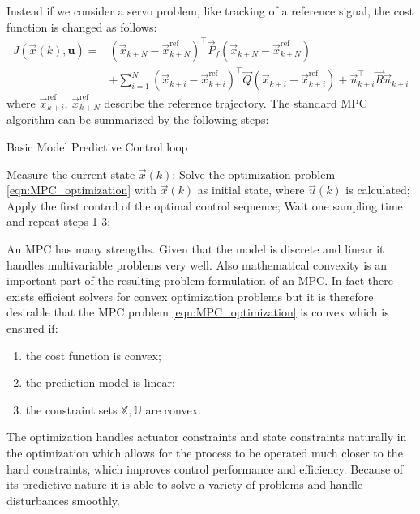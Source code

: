 Instead if we consider a servo problem, like tracking of a reference signal, the cost function is changed as follows:
\begin{equation}
\label{eqn:MPC_cost_function_servo}
\begin{aligned}
J(\vec{x}(k), \textbf{u})=& (\vec{x}_{k+N}-\vec{x}^\text{ref}_{k+N})^\intercal\vec{P}_f(\vec{x}_{k+N}-\vec{x}^\text{ref}_{k+N})\\
&+\sum_{i=1}^{N}(\vec{x}_{k+i}-\vec{x}^\text{ref}_{k+i})^\intercal\vec{Q}(\vec{x}_{k+i}-\vec{x}^\text{ref}_{k+i})+\vec{u}_{k+i}^\intercal\vec{R}\vec{u}_{k+i}
\end{aligned}
\end{equation}
where $\vec{x}^\text{ref}_{k+i}$, $\vec{x}^\text{ref}_{k+N}$ describe the reference trajectory. The standard MPC algorithm can be summarized by the following steps:
\begin{algorithm}%
	\caption{Basic Model Predictive Control loop}
	\small
	\begin{algorithmic}[1]
		\State Measure the current state $\vec{x}(k)$;
		\State Solve the optimization problem \ref{eqn:MPC_optimization} with $\vec{x}(k)$ as initial state, where $\vec{u}(k)$ is calculated;
		\State Apply the first control of the optimal control sequence;
		\State Wait one sampling time and repeat steps 1-3;
	\end{algorithmic}
	\label{alg:rightOvertaking}
\end{algorithm}

An MPC has many strengths. Given that the model is discrete and linear it handles multivariable problems very well. Also mathematical convexity is an important part of the resulting problem formulation of an MPC. In fact there exists efficient solvers for convex optimization problems but it is therefore desirable that the MPC problem \ref{eqn:MPC_optimization} is convex which is ensured if:
\begin{enumerate}
\item the cost function is convex;
\item the prediction model is linear;
\item the constraint sets $\mathbb{X}, \mathbb{U}$ are convex.	
\end{enumerate}	
The optimization handles actuator constraints and state constraints naturally in the optimization which allows for
the process to be operated much closer to the hard constraints, which improves control performance and efficiency. Because of its predictive nature it is able to solve a variety of problems and handle disturbances smoothly.

